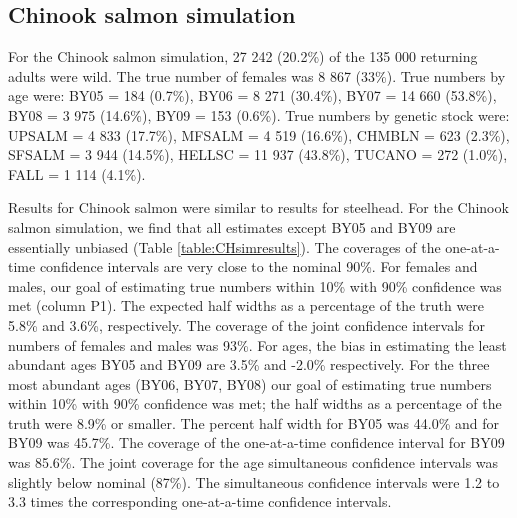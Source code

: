 \documentclass[%
                leqno,         %
%
]{nrc1}                          %
\begin{document}
\subsection*{Chinook salmon simulation}

For the Chinook salmon simulation, 27 242 (20.2\%) of the 135 000 returning adults were wild. The true number of females was 8 867 (33\%). True numbers by age were: BY05 = 184 (0.7\%), BY06 = 8 271 (30.4\%), BY07 = 14 660 (53.8\%), BY08 = 3 975 (14.6\%), BY09 = 153 (0.6\%). True numbers by genetic stock were: UPSALM = 4 833 (17.7\%), MFSALM = 4 519 (16.6\%), CHMBLN = 623 (2.3\%), SFSALM = 3 944 (14.5\%), HELLSC = 11 937 (43.8\%), TUCANO = 272 (1.0\%), FALL = 1 114 (4.1\%).

Results for Chinook salmon were similar to results for steelhead. For the Chinook salmon simulation, we find that all estimates except BY05 and BY09 are essentially unbiased (Table \ref{table:CHsimresults}). The coverages of the one-at-a-time confidence intervals are very close to the nominal 90\%. For females and males, our goal of estimating true numbers within 10\% with 90\% confidence was met (column P1). The expected half widths as a percentage of the truth were 5.8\% and 3.6\%, respectively. The coverage of the joint confidence intervals for numbers of females and males was 93\%. For ages, the bias in estimating the least abundant ages BY05 and BY09 are 3.5\% and -2.0\% respectively. For the three most abundant ages (BY06, BY07, BY08) our goal of estimating true numbers within 10\% with 90\% confidence was met; the half widths as a percentage of the truth were 8.9\% or smaller. The percent half width for BY05 was 44.0\% and for BY09 was 45.7\%. The coverage of the one-at-a-time confidence interval for BY09 was 85.6\%. The joint coverage for the age simultaneous confidence intervals was slightly below nominal (87\%). The simultaneous confidence intervals were 1.2 to 3.3 times the corresponding one-at-a-time confidence intervals.
\end{document}
